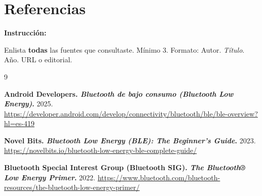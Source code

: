 \documentclass[12pt, letterpaper]{article}
\newenvironment{instruccion}{%
  \begin{mdframed}[
    backgroundcolor = tealLight,
    linecolor       = tealMain,
    linewidth       = 1pt,
    innerleftmargin = 10pt, innerrightmargin = 10pt,
    innertopmargin  = 6pt,  innerbottommargin= 6pt
  ]
  \small\color{tealMain}\textbf{Instrucción:}\hspace{4pt}\color{black}
}{%
  \end{mdframed}
}
\begin{document}
\section*{Referencias}

\begin{instruccion}
  Enlista \textbf{todas} las fuentes que consultaste. Mínimo 3.
  Formato: Autor. \textit{Título}. Año. URL o editorial.
\end{instruccion}

\begin{thebibliography}{9}

   \textbf{Android Developers. \textit{Bluetooth de bajo consumo (Bluetooth Low Energy)}.} 2025. \href{https://developer.android.com/develop/connectivity/bluetooth/ble/ble-overview?hl=es-419}{https://developer.android.com/develop/connectivity/bluetooth/ble/ble-overview?hl=es-419} 

    \textbf{Novel Bits. \textit{Bluetooth Low Energy (BLE): The Beginner's Guide}.} 2023. \href{https://novelbits.io/bluetooth-low-energy-ble-complete-guide/}{https://novelbits.io/bluetooth-low-energy-ble-complete-guide/} 

    \textbf{Bluetooth Special Interest Group (Bluetooth SIG). \textit{The Bluetooth® Low Energy Primer}.} 2022. \href{https://www.bluetooth.com/bluetooth-resources/the-bluetooth-low-energy-primer/}{https://www.bluetooth.com/bluetooth-resources/the-bluetooth-low-energy-primer/} 


\end{thebibliography}
\end{document}

